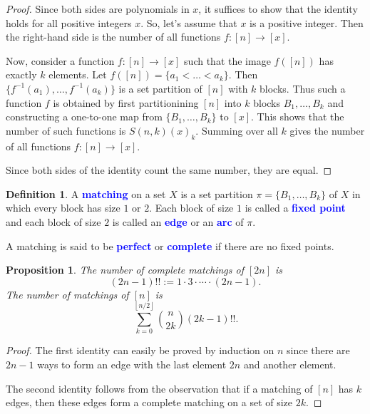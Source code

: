 \documentclass[oneside]{book}
\numberwithin{equation}{section}
\newtheorem{prop}[thm]{Proposition}
\theoremstyle{definition}
\newtheorem{defn}[thm]{Definition}
\newcommand\flr[1]{\left\lfloor #1\right\rfloor}
\renewcommand\emph[1]{\textcolor{blue}{\bf #1}}
\begin{document}
\begin{proof}
  Since both sides are polynomials in \( x \), it suffices to show
  that the identity holds for all positive integers \( x \). So, let's
  assume that \( x \) is a positive integer. Then the right-hand side
  is the number of all functions \( f: [n] \to [x] \).

  Now, consider a function \( f: [n] \to [x] \) such that the image
  \( f([n]) \) has exactly \( k \) elements. Let
  \( f([n]) = \{a_1<\dots<a_k\} \). Then
  \( \{f^{-1}(a_1),\dots,f^{-1}(a_k)\} \) is a set partition of
  \( [n] \) with \( k \) blocks. Thus such a function \( f \) is
  obtained by first partitionining \( [n] \) into \( k \) blocks
  \( B_1,\dots,B_k \) and constructing a one-to-one map from
  \( \{B_1,\dots,B_k\} \) to \( [x] \). This shows that the number of
  such functions is \( S(n,k) (x)_k \). Summing over all \( k \) gives
  the number of all functions \( f: [n] \to [x] \).

  Since both sides of the identity count the same number, they are
  equal.
\end{proof}

\begin{defn}
  A \emph{matching} on a set \( X \) is a set partition
  \( \pi = \{B_1,\dots,B_k\} \) of \( X \) in which every block has
  size \( 1 \) or \( 2 \). Each block of size \( 1 \) is called a
  \emph{fixed point} and each block of size \( 2 \) is called an
  \emph{edge} or an \emph{arc} of \( \pi \).
\end{defn}

A matching is said to be \emph{perfect} or \emph{complete} if there
are no fixed points.

\begin{prop}
  The number of complete matchings of \( [2n] \) is
  \[
    (2n-1)!! := 1 \cdot 3 \cdot \cdots \cdot (2n-1).
  \]
  The number of matchings of \( [n] \) is
  \[
    \sum_{k=0}^{\flr{n/2}} \binom{n}{2k} (2k-1)!!.
  \]
\end{prop}

\begin{proof}
  The first identity can easily be proved by induction on \( n \)
  since there are \( 2n-1 \) ways to form an edge with the last
  element \( 2n \) and another element.

  The second identity follows from the observation that if a matching
  of \( [n] \) has \( k \) edges, then these edges form a complete
  matching on a set of size \( 2k \).
\end{proof}
\end{document}
